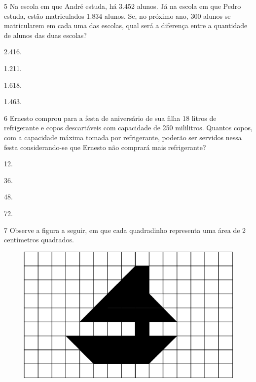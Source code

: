 \num{5} Na escola em que André estuda, há 3.452 alunos. Já na escola em que
Pedro estuda, estão matriculados 1.834 alunos. Se, no próximo ano, 300
alunos se matricularem em cada uma das escolas, qual será a diferença
entre a quantidade de alunos das duas escolas?

\begin{multicols}{2}
\begin{escolha}
\item
  2.416.
\item
  1.211.
\item
  1.618.
\item
  1.463.
\end{escolha}
\end{multicols}

\num{6} Ernesto comprou para a festa de aniversário de sua filha 18 litros de
refrigerante e copos descartáveis com capacidade de 250 mililitros.
Quantos copos, com a capacidade máxima tomada por refrigerante, poderão
ser servidos nessa festa considerando-se que Ernesto não comprará mais
refrigerante?

\begin{multicols}{2}
\begin{escolha}
\item
  12.
\item
  36.
\item
  48.
\item
  72.
\end{escolha}
\end{multicols}

\num{7} Observe a figura a seguir, em que cada quadradinho representa uma área de 2 centímetros quadrados.

\begin{figure}[htpb!]
\centering
\includegraphics[width=\textwidth]{media/image77.png}
\end{figure}

